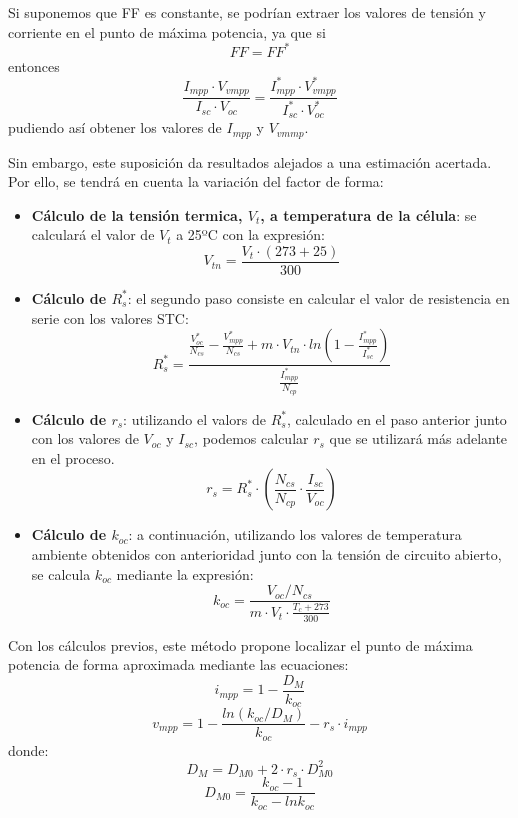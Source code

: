 Si suponemos que FF es constante, se podrían extraer los valores de tensión y corriente en el punto de máxima potencia, ya que si
\begin{equation}
FF=FF^*
\end{equation}
entonces
\begin{equation}
\frac{I_{mpp}\cdot V_{vmpp}}{I_{sc}\cdot V_{oc}}=\frac{I_{mpp}^*\cdot V_{vmpp}^*}{I_{sc}^*\cdot V_{oc}^*}
\end{equation}
pudiendo así obtener los valores de \(I_{mpp}\) y \(V_{vmmp}\).

Sin embargo, este suposición da resultados alejados a una estimación acertada. Por ello, se tendrá en cuenta la variación del factor de forma:
\begin{itemize}
\item \textbf{Cálculo de la tensión termica, \(V_t\), a temperatura de la célula}: se calculará el valor de \(V_t\) a 25ºC con la expresión:
\begin{equation}
V_{tn}=\frac{V_t\cdot (273+25)}{300}
\end{equation}
\item \textbf{Cálculo de \(R_s^*\)}: el segundo paso consiste en calcular el valor de resistencia en serie con los valores STC:
\begin{equation}
R_s^*=\frac{\frac{V_{oc}^*}{N_{cs}}-\frac{V_{mpp}^*}{N_{cs}}+m\cdot V_{tn}\cdot ln(1-\frac{I_{mpp}^*}{I_{sc}^*})}{\frac{I_{mpp}^*}{N_{cp}}}
\end{equation}
\item \textbf{Cálculo de \(r_s\)}: utilizando el valors de \(R_s^*\), calculado en el paso anterior junto con los valores de \(V_{oc}\) y \(I_{sc}\), podemos calcular \(r_s\) que se utilizará más adelante en el proceso.
\begin{equation}
r_s=R_s^*\cdot (\frac{N_{cs}}{N_{cp}}\cdot \frac{I_{sc}}{V_{oc}})
\end{equation}
\item \textbf{Cálculo de \(k_{oc}\)}: a continuación, utilizando los valores de temperatura ambiente obtenidos con anterioridad junto con la tensión de circuito abierto, se calcula \(k_{oc}\) mediante la expresión:
\begin{equation}
k_{oc}=\frac{V_{oc}/N_{cs}}{m\cdot V_t \cdot \frac{T_c+273}{300}}
\end{equation}
\end{itemize}

Con los cálculos previos, este método propone localizar el punto de máxima potencia de forma aproximada mediante las ecuaciones:
\begin{equation}
i_{mpp}=1-\frac{D_M}{k_{oc}}
\end{equation}
\begin{equation}
v_{mpp}=1-\frac{ln(k_{oc}/D_M)}{k_{oc}}-r_s\cdot i_{mpp}
\end{equation}
donde:
\begin{equation}
D_M=D_{M0}+2\cdot r_s\cdot D_{M0}^2
\end{equation}
\begin{equation}
D_{M0}=\frac{k_{oc}-1}{k_{oc}-lnk_{oc}}
\end{equation}


